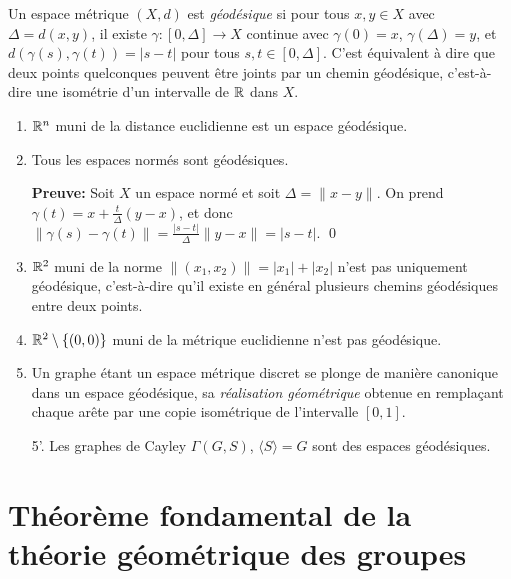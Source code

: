   \begin{defi} 
    Un espace métrique $(X, d)$ est \emph{géodésique} si pour tous $x, y \in X$ avec $\Delta = d(x,y)$, il
    existe $\gamma:[0, \Delta] \to X$ continue avec $\gamma(0) = x$, $\gamma(\Delta) = y$, et $d(\gamma(s),
    \gamma(t)) = |s-t|$ pour tous $s, t \in [0, \Delta]$. C'est équivalent à dire que deux points quelconques
    peuvent être joints par un chemin géodésique, c'est-à-dire une isométrie d'un intervalle de $\mathbb{R}$ dans $X$.
  \end{defi}

  \begin{exs}
    \begin{enumerate}
    \item $\mathbb{R}^n$ muni de la distance euclidienne est un espace géodésique.
    \item Tous les espaces normés sont géodésiques.

      \textbf{Preuve:} Soit $X$ un espace normé et soit $\Delta = \|x - y\|$. On prend $\gamma(t) = x +
      \frac{t}{\Delta}(y-x)$, et donc $\|\gamma(s) - \gamma(t)\| = \frac{|s-t|}{\Delta}\|y-x\| = |s-t|$. \qed

    \item $\mathbb{R}^2$ muni de la norme $\|(x_1, x_2)\| = |x_1| + |x_2|$ n'est pas uniquement géodésique,
      c'est-à-dire qu'il existe en général plusieurs chemins géodésiques entre deux points.

    \item $\mathbb{R}^2 \setminus \{(0,0)\}$ muni de la métrique euclidienne n'est pas géodésique.

      
    \item Un graphe étant un espace métrique discret se plonge de manière canonique dans un espace géodésique,
      sa \emph{réalisation géométrique}  obtenue en remplaçant chaque arête par
      une copie isométrique de l'intervalle $[0,1]$.

      
    \item[5'.] Les graphes de Cayley $\Gamma(G, S)$, $\langle S \rangle = G$ sont des espaces géodésiques.
    \end{enumerate}
  \end{exs}
  
 

  \section{Théorème fondamental de la théorie géométrique des groupes}
  \label{sec:thm-fond-theorie-geom-groupes}


